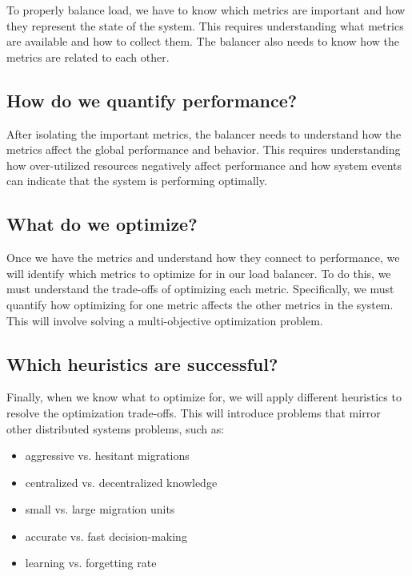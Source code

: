 To properly balance load, we have to know which metrics are important and how
they represent the state of the system. This requires understanding what
metrics are available and how to collect them. The balancer also needs to know
how the metrics are related to each other.

\subsection*{How do we quantify performance?}

After isolating the important metrics, the balancer needs to understand how the
metrics affect the global performance and behavior. This requires understanding
how over-utilized resources negatively affect performance and how system events
can indicate that the system is performing optimally.

\subsection*{What do we optimize?}

Once we have the metrics and understand how they connect to performance, we
will identify which metrics to optimize for in our load balancer. To do this,
we must understand the trade-offs of optimizing each metric. Specifically, we
must quantify how optimizing for one metric affects the other metrics in the
system. This will involve solving a multi-objective optimization problem. 

\subsection*{Which heuristics are successful?}

Finally, when we know what to optimize for, we will apply different heuristics
to resolve the optimization trade-offs. This will introduce problems that
mirror other distributed systems problems, such as:

\begin{itemize}
	\item aggressive vs. hesitant migrations	
	\item centralized vs. decentralized knowledge
	\item small vs. large migration units
	\item accurate vs. fast decision-making
	\item learning vs. forgetting rate
\end{itemize}
